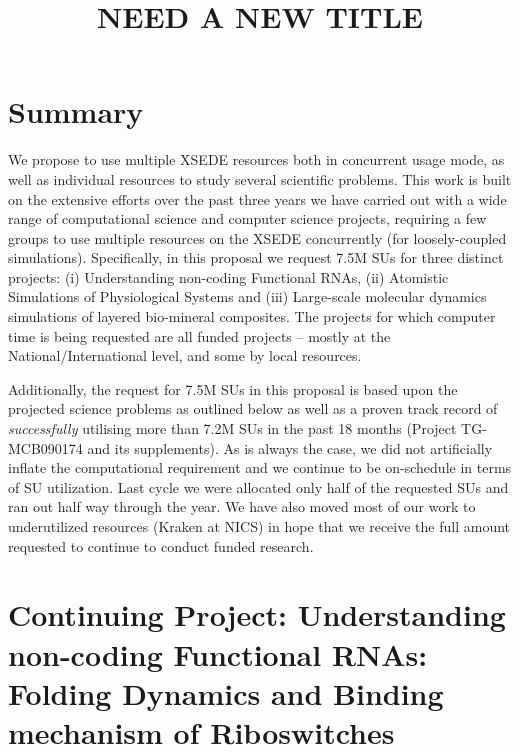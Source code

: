 \documentclass[a4paper,10pt]{article}
\begin{document}
\title{\large NEED A NEW TITLE}

\date{}

\maketitle
 
\section{Summary}
We propose to use multiple XSEDE resources both in concurrent usage mode, as well as individual resources to study several scientific problems.  This work is built on the extensive efforts over the past three years we have carried out with a wide range of computational science and computer science projects, requiring a few groups to use multiple resources on the XSEDE concurrently (for loosely-coupled simulations).  Specifically, in this proposal we request 7.5M SUs for three distinct projects: (i) Understanding non-coding Functional RNAs, (ii) Atomistic Simulations of Physiological Systems and (iii) Large-scale molecular dynamics simulations of layered bio-mineral composites. The projects for which computer time is being requested are all funded projects -- mostly at the National/International level, and some by local resources.

Additionally, the request for 7.5M SUs in this proposal is based upon the projected science problems as outlined below as well as a proven track record of {\it successfully} utilising more than 7.2M SUs in the past 18 months (Project TG-MCB090174 and its supplements). As is always the case, we did not artificially inflate the computational requirement and we continue to be on-schedule in terms of SU utilization. Last cycle we were allocated only half of the requested SUs and ran out half way through the year. We have also moved most of our work to underutilized resources (Kraken at NICS) in hope that we receive the full amount requested to continue to conduct funded research.

\section{Continuing Project: Understanding non-coding Functional RNAs: 
Folding Dynamics and Binding mechanism of Riboswitches}
\end{document}
